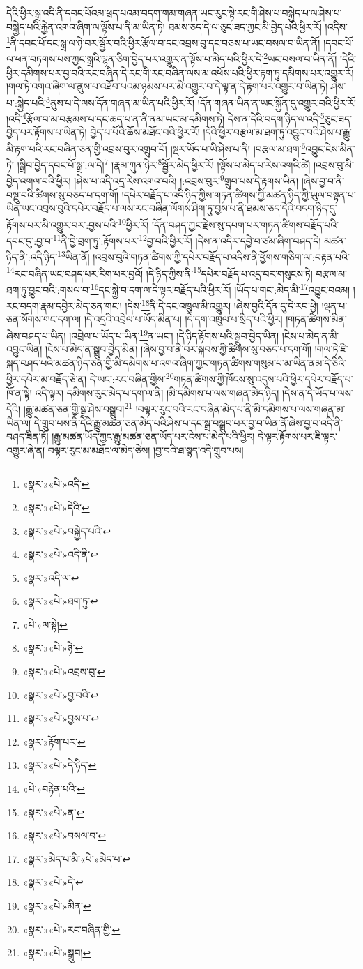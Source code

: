 དེའི་ཕྱིར་སྒྲ་འདི་ནི་དབང་པོའམ་ཕྲད་པའམ་བདག་གམ་གཞན་ཡང་རུང་སྟེ་རང་གི་ཤེས་པ་བསྐྱེད་པ་ལ་ཤེས་པ་བསྐྱེད་པའི་རྐྱེན་འགའ་ཞིག་ལ་ལྟོས་པ་ནི་མ་ཡིན་ཏེ། ཐམས་ཅད་དེ་ལ་ཅུང་ཟད་ཀྱང་མི་བྱེད་པའི་ཕྱིར་རོ། །འདིས་\footnote{«སྣར་»«པེ་»འདི་}ནི་དབང་པོ་དང་སྒྲ་ལ་ཉེ་བར་སྦྱོར་བའི་ཕྱིར་རྩོལ་བ་དང་འབྲས་བུ་དང་བཅས་པ་ཡང་བསལ་བ་ཡིན་ནོ། །དབང་པོ་ལ་ཕན་བཏགས་པས་ཀྱང་སྒྲའི་ལྷན་ཅིག་བྱེད་པར་འགྱུར་ན་ལྟོས་པ་མེད་པའི་ཕྱིར་དེ་\footnote{«སྣར་»«པེ་»དེའི་}ཡང་བསལ་བ་ཡིན་ནོ། །དེའི་ཕྱིར་དམིགས་པར་བྱ་བའི་རང་བཞིན་དེ་རང་གི་རང་བཞིན་ལས་མ་འཕོས་པའི་ཕྱིར་རྟག་ཏུ་དམིགས་པར་འགྱུར་རོ། །གལ་ཏེ་འགའ་ཞིག་ལ་ནུས་པ་འཐོབ་པའམ་ཉམས་པར་མི་འགྱུར་བ་དེ་ལྟ་ན་དེ་རྟག་པར་འགྱུར་བ་ཡིན་ཏེ། ཤེས་པ་:སྐྱེད་པའི་\footnote{«སྣར་»«པེ་»བསྐྱེད་པའི་}ནུས་པ་དེ་ལས་དོན་གཞན་མ་ཡིན་པའི་ཕྱིར་རོ། །དོན་གཞན་ཡིན་ན་ཡང་སྐྱོན་དུ་འགྱུར་བའི་ཕྱིར་རོ། །འདི་\footnote{«སྣར་»«པེ་»འདི་ནི་}རྩོལ་བ་མ་བརྩམས་པ་དང་ཆད་པ་ན་ནི་ནམ་ཡང་མ་དམིགས་ཏེ། དེས་ན་དེའི་བདག་ཉིད་ལ་འདི་\footnote{«སྣར་»འདི་ལ་}ཅུང་ཟད་བྱེད་པར་རྟོགས་པ་ཡིན་ཏེ། བྱེད་པ་པོའི་ཆོས་མཐོང་བའི་ཕྱིར་རོ། །དེའི་ཕྱིར་བརྩལ་མ་ཐག་ཏུ་འབྱུང་བའི་ཤེས་པ་རྒྱུ་མི་རྟག་པའི་རང་བཞིན་ཅན་གྱི་འབྲས་བུར་འགྲུབ་བོ། །སྔར་ཡོད་པ་ཡི་ཤེས་པ་ནི། །བརྩལ་མ་ཐག་\footnote{«སྣར་»«པེ་»ཐག་ཏུ་}འབྱུང་ངེས་མིན་ཏེ། །སྒྲིབ་བྱེད་དབང་པོ་སྒྲ་:ལ་དེ།\footnote{«པེ་»ལ་སྟེ།} །རྣམ་ཀུན་ཉེར་\footnote{«སྣར་»«པེ་»ཉེ་}སྦྱོར་མེད་ཕྱིར་རོ། །ལྟོས་པ་མེད་པ་རེས་འགའི་ཚེ། །འབྲས་བུ་མི་བྱེད་འགལ་བའི་ཕྱིར། །ཤེས་པ་འདི་འདྲ་རེས་འགའ་བའི། །:འབྲས་བུར་\footnote{«སྣར་»«པེ་»འབྲས་བུ་}གྲུབ་པས་དེ་རྟགས་ཡིན། །ཞེས་བྱ་བ་ནི་བསྡུ་བའི་ཚིགས་སུ་བཅད་པ་དག་གོ། །དཔེར་བརྗོད་པ་འདི་ཉིད་ཀྱིས་གཏན་ཚིགས་ཀྱི་མཚན་ཉིད་ཀྱི་ཡུལ་བསྟན་པ་ཡིན་ཡང་འབྲས་བུའི་དཔེར་བརྗོད་པ་ལས་རང་བཞིན་ལོགས་ཤིག་ཏུ་བྱས་པ་ནི་ཐམས་ཅད་དེའི་བདག་ཉིད་དུ་རྟོགས་པར་མི་འགྱུར་བར་:བྱས་པའི་\footnote{«སྣར་»«པེ་»བྱ་བའི་}ཕྱིར་རོ། །དོན་བཤད་ཀྱང་རྗེས་སུ་དཔག་པར་གཏན་ཚིགས་བརྗོད་པའི་དབང་དུ་:བྱ་བ་\footnote{«སྣར་»«པེ་»བྱས་པ་}ནི་བྱེ་བྲག་ཏུ་:རྟོགས་པར་\footnote{«སྣར་»རྟོག་པར་}བྱ་བའི་ཕྱིར་རོ། །དེས་ན་འདིར་དབྱེ་བ་ཙམ་ཞིག་བཤད་དེ། མཚན་ཉིད་ནི་:འདི་ཉིད་\footnote{«སྣར་»«པེ་»དེ་ཉིད་}ཡིན་ནོ། །འབྲས་བུའི་གཏན་ཚིགས་ཀྱི་དཔེར་བརྗོད་པ་འདིས་ནི་ཕྱོགས་གཅིག་ལ་:བརྟན་པའི་\footnote{«པེ་»བརྟེན་པའི་}རང་བཞིན་ཡང་བཤད་པར་རིག་པར་བྱའོ། །དེ་ཉིད་ཀྱིས་ནི་\footnote{«སྣར་»«པེ་»ན་}དཔེར་བརྗོད་པ་འདྲ་བར་གསུངས་ཏེ། བརྩལ་མ་ཐག་ཏུ་བྱུང་བའི་:གསལ་བ་\footnote{«སྣར་»«པེ་»བསལ་བ་}དང་སྐྱེ་བ་དག་ལ་དེ་ལྟར་བརྗོད་པའི་ཕྱིར་རོ། །ཡོད་པ་གང་:མེད་མི་\footnote{«སྣར་»མེད་པ་མི་«པེ་»མེད་པ་}འབྱུང་བའམ། །རང་བདག་རྣམ་དབྱེར་མེད་ཅན་གང་། །དེས་\footnote{«སྣར་»«པེ་»དེ་}ནི་དེ་དང་འཁྲུལ་མི་འགྱུར། །ཞེས་བྱའི་དོན་དུ་དེ་རབ་ཕྱེ། །ལྡན་པ་ཅན་སོགས་གང་དག་ལ། །དེ་འདྲའི་འབྲེལ་པ་ཡོད་མིན་པ། །དེ་དག་འཁྲུལ་པ་སྲིད་པའི་ཕྱིར། །གཏན་ཚིགས་མིན་ཞེས་བཤད་པ་ཡིན། །འབྲེལ་པ་ཡོད་པ་ཡིན་\footnote{«སྣར་»«པེ་»མིན་}ན་ཡང་། །དེ་ཉིད་རྟོགས་པའི་སྒྲུབ་བྱེད་ཡིན། །ངེས་པ་མེད་ན་མི་འབྱུང་ཡིན། །ངེས་པ་མེད་ན་སྒྲུབ་བྱེད་མིན། །ཞེས་བྱ་བ་ནི་བར་སྐབས་ཀྱི་ཚིགས་སུ་བཅད་པ་དག་གོ། །གལ་ཏེ་ཇི་སྐད་བཤད་པའི་མཚན་ཉིད་ཅན་གྱི་མི་དམིགས་པ་འགའ་ཞིག་ཀྱང་གཏན་ཚིགས་གསུམ་པ་མ་ཡིན་ནམ་དེ་ཅིའི་ཕྱིར་དཔེར་མ་བརྗོད་ཅེ་ན། དེ་ཡང་:རང་བཞིན་གྱིས་\footnote{«སྣར་»«པེ་»རང་བཞིན་གྱི་}གཏན་ཚིགས་ཀྱི་ཁོངས་སུ་འདུས་པའི་ཕྱིར་དཔེར་བརྗོད་པ་ཁོ་ན་སྟེ། འདི་ལྟར། དམིགས་རུང་མེད་པ་དག་ལ་ནི། །མི་དམིགས་པ་ལས་གཞན་མེད་ཉིད། །དེས་ན་དེ་ཡོད་པ་ལས་དེའི། །རྒྱུ་མཚན་ཅན་གྱི་སྒྲ་ཤེས་བསྒྲུབ།\footnote{«སྣར་»«པེ་»སྒྲུབ།} །བལྟར་རུང་བའི་རང་བཞིན་མེད་པ་ནི་མི་དམིགས་པ་ལས་གཞན་མ་ཡིན་ལ། དེ་གྲུབ་པས་ནི་དེའི་རྒྱུ་མཚན་ཅན་མེད་པའི་ཤེས་པ་དང་སྒྲ་བསྒྲུབ་པར་བྱ་བ་ཡིན་ནོ་ཞེས་བྱ་བ་འདི་ནི་བཤད་ཟིན་ཏོ། །རྒྱུ་མཚན་ཡོད་ཀྱང་རྒྱུ་མཚན་ཅན་ཡོད་པར་ངེས་པ་མེད་པའི་ཕྱིར། དེ་ལྟར་རྟོགས་པར་ཇི་ལྟར་འགྱུར་ཞེ་ན། བལྟར་རུང་མ་མཐོང་ལ་མེད་ཅེས། །བྱ་བའི་ཐ་སྙད་འདི་གྲུབ་པས། 